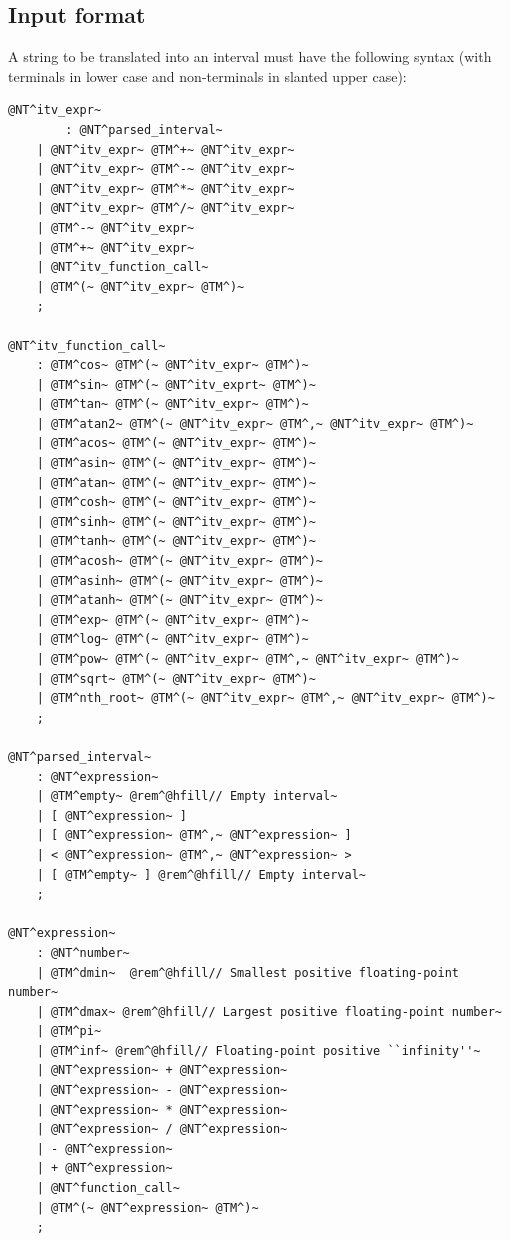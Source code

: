 \documentclass{manual}
\begin{document}
\subsection{Input format}\label{sec:input-format}

A string to be translated into an interval must have the following
syntax (with terminals in lower case and non-terminals in slanted upper case):

\begin{Verbatim}[commandchars=\@\^\~]
@NT^itv_expr~
        : @NT^parsed_interval~
	| @NT^itv_expr~ @TM^+~ @NT^itv_expr~
	| @NT^itv_expr~ @TM^-~ @NT^itv_expr~
	| @NT^itv_expr~ @TM^*~ @NT^itv_expr~
	| @NT^itv_expr~ @TM^/~ @NT^itv_expr~
	| @TM^-~ @NT^itv_expr~
	| @TM^+~ @NT^itv_expr~
	| @NT^itv_function_call~
	| @TM^(~ @NT^itv_expr~ @TM^)~
	;

@NT^itv_function_call~
	: @TM^cos~ @TM^(~ @NT^itv_expr~ @TM^)~
	| @TM^sin~ @TM^(~ @NT^itv_exprt~ @TM^)~
	| @TM^tan~ @TM^(~ @NT^itv_expr~ @TM^)~
	| @TM^atan2~ @TM^(~ @NT^itv_expr~ @TM^,~ @NT^itv_expr~ @TM^)~
	| @TM^acos~ @TM^(~ @NT^itv_expr~ @TM^)~
	| @TM^asin~ @TM^(~ @NT^itv_expr~ @TM^)~
	| @TM^atan~ @TM^(~ @NT^itv_expr~ @TM^)~
	| @TM^cosh~ @TM^(~ @NT^itv_expr~ @TM^)~
	| @TM^sinh~ @TM^(~ @NT^itv_expr~ @TM^)~
	| @TM^tanh~ @TM^(~ @NT^itv_expr~ @TM^)~
	| @TM^acosh~ @TM^(~ @NT^itv_expr~ @TM^)~
	| @TM^asinh~ @TM^(~ @NT^itv_expr~ @TM^)~
	| @TM^atanh~ @TM^(~ @NT^itv_expr~ @TM^)~
	| @TM^exp~ @TM^(~ @NT^itv_expr~ @TM^)~
	| @TM^log~ @TM^(~ @NT^itv_expr~ @TM^)~
	| @TM^pow~ @TM^(~ @NT^itv_expr~ @TM^,~ @NT^itv_expr~ @TM^)~
	| @TM^sqrt~ @TM^(~ @NT^itv_expr~ @TM^)~
	| @TM^nth_root~ @TM^(~ @NT^itv_expr~ @TM^,~ @NT^itv_expr~ @TM^)~
	;

@NT^parsed_interval~
	: @NT^expression~
	| @TM^empty~ @rem^@hfill// Empty interval~
	| [ @NT^expression~ ]
	| [ @NT^expression~ @TM^,~ @NT^expression~ ]
	| < @NT^expression~ @TM^,~ @NT^expression~ >
	| [ @TM^empty~ ] @rem^@hfill// Empty interval~
	;

@NT^expression~
	: @NT^number~
	| @TM^dmin~  @rem^@hfill// Smallest positive floating-point number~
	| @TM^dmax~ @rem^@hfill// Largest positive floating-point number~
	| @TM^pi~
	| @TM^inf~ @rem^@hfill// Floating-point positive ``infinity''~
	| @NT^expression~ + @NT^expression~
	| @NT^expression~ - @NT^expression~
	| @NT^expression~ * @NT^expression~
	| @NT^expression~ / @NT^expression~
	| - @NT^expression~
	| + @NT^expression~
	| @NT^function_call~
	| @TM^(~ @NT^expression~ @TM^)~
	;


\end{Verbatim}
\end{document}
